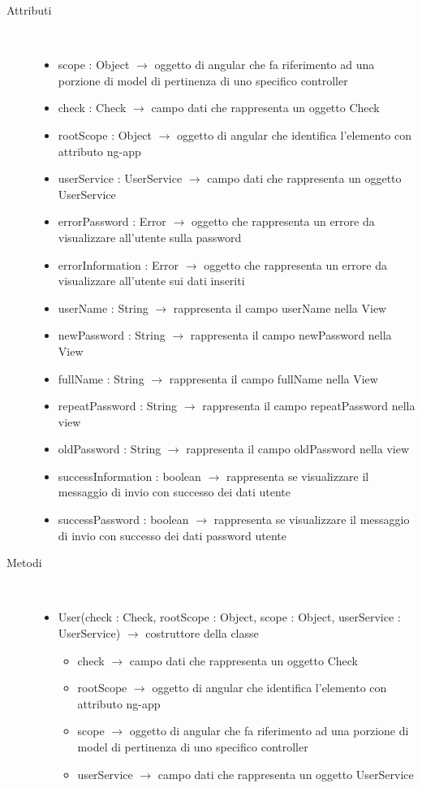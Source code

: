 \begin{description}
\item[Attributi] \hfill \\
\vspace{-7mm}
\begin{itemize}
	\item scope : Object $\rightarrow$ oggetto di angular che fa riferimento ad una porzione di model di pertinenza di uno specifico controller
	\item check : Check $\rightarrow$ campo dati che rappresenta un oggetto Check
	\item rootScope : Object $\rightarrow$ oggetto di angular che identifica l’elemento con attributo ng-app
	\item userService : UserService $\rightarrow$ campo dati che rappresenta un oggetto UserService
	\item errorPassword : Error $\rightarrow$ oggetto che rappresenta un errore da visualizzare all'utente sulla password
	\item errorInformation : Error $\rightarrow$ oggetto che rappresenta un errore da visualizzare all'utente sui dati inseriti
	\item userName : String $\rightarrow$ rappresenta il campo userName nella View
	\item newPassword : String $\rightarrow$ rappresenta il campo newPassword nella View	
	\item fullName : String $\rightarrow$ rappresenta il campo fullName nella View
	\item repeatPassword : String $\rightarrow$ rappresenta il campo repeatPassword nella view	
	\item oldPassword : String $\rightarrow$ rappresenta il campo oldPassword nella view
	\item successInformation : boolean $\rightarrow$ rappresenta se visualizzare il messaggio di invio con successo dei dati utente
	\item successPassword : boolean $\rightarrow$ rappresenta se visualizzare il messaggio di invio con successo dei dati password utente
\end{itemize}

\item[Metodi] \hfill \\
\vspace{-7mm}
\begin{itemize}
	\item User(check : Check, rootScope : Object, scope : Object, userService : UserService) $\rightarrow$ costruttore della classe\begin{itemize}
		\item check $\rightarrow$ campo dati che rappresenta un oggetto Check
		\item rootScope $\rightarrow$ oggetto di angular che identifica l’elemento con attributo ng-app
		\item scope $\rightarrow$ oggetto di angular che fa riferimento ad una porzione di model di pertinenza di uno specifico controller
		\item userService $\rightarrow$ campo dati che rappresenta un oggetto UserService
	\end{itemize}
	

\end{itemize}
\end{description}
